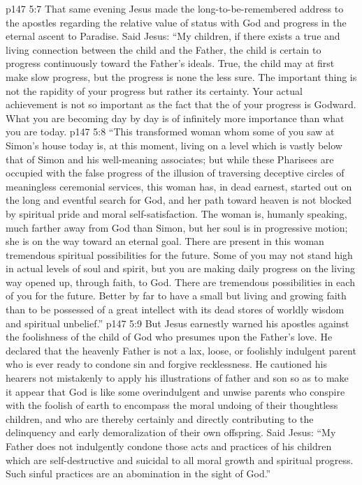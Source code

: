 \vs p147 5:7 \pc That same evening Jesus made the long\hyp{}to\hyp{}be\hyp{}remembered address to the apostles regarding the relative value of status with God and progress in the eternal ascent to Paradise. Said Jesus: “My children, if there exists a true and living connection between the child and the Father, the child is certain to progress continuously toward the Father’s ideals. True, the child may at first make slow progress, but the progress is none the less sure. The important thing is not the rapidity of your progress but rather its certainty. Your actual achievement is not so important as the fact that the  of your progress is Godward. What you are becoming day by day is of infinitely more importance than what you are today.
\vs p147 5:8 \textcolor{ubdarkred}{“This transformed woman whom some of you saw at Simon’s house today is, at this moment, living on a level which is vastly below that of Simon and his well\hyp{}meaning associates; but while these Pharisees are occupied with the false progress of the illusion of traversing deceptive circles of meaningless ceremonial services, this woman has, in dead earnest, started out on the long and eventful search for God, and her path toward heaven is not blocked by spiritual pride and moral self\hyp{}satisfaction. The woman is, humanly speaking, much farther away from God than Simon, but her soul is in progressive motion; she is on the way toward an eternal goal. There are present in this woman tremendous spiritual possibilities for the future. Some of you may not stand high in actual levels of soul and spirit, but you are making daily progress on the living way opened up, through faith, to God. There are tremendous possibilities in each of you for the future. Better by far to have a small but living and growing faith than to be possessed of a great intellect with its dead stores of worldly wisdom and spiritual unbelief.”}
\vs p147 5:9 But Jesus earnestly warned his apostles against the foolishness of the child of God who presumes upon the Father’s love. He declared that the heavenly Father is not a lax, loose, or foolishly indulgent parent who is ever ready to condone sin and forgive recklessness. He cautioned his hearers not mistakenly to apply his illustrations of father and son so as to make it appear that God is like some overindulgent and unwise parents who conspire with the foolish of earth to encompass the moral undoing of their thoughtless children, and who are thereby certainly and directly contributing to the delinquency and early demoralization of their own offspring. Said Jesus: \textcolor{ubdarkred}{“My Father does not indulgently condone those acts and practices of his children which are self\hyp{}destructive and suicidal to all moral growth and spiritual progress. Such sinful practices are an abomination in the sight of God.”}

